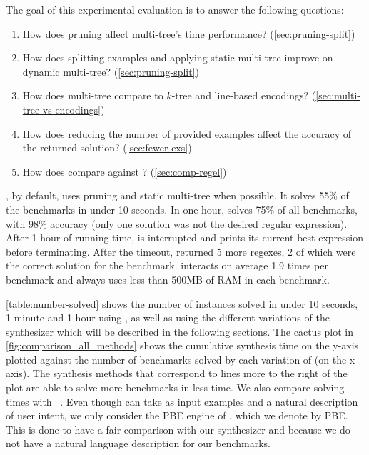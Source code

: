 \medskip\noindent
The goal of this experimental evaluation is to answer the following questions:
\begin{enumerate}[topsep=3pt, label=\textbf{Q\arabic*}.]
\item How does pruning affect multi-tree's time performance? (\autoref{sec:pruning-split})
%
\item How does splitting examples and applying static multi-tree improve on dynamic multi-tree? (\autoref{sec:pruning-split})
%
\item How does multi-tree compare to \(k\)-tree and line-based encodings? (\autoref{sec:multi-tree-vs-encodings})
%
\item How does reducing the number of provided examples affect the accuracy of the returned solution? (\autoref{sec:fewer-exs})
%
\item How does \Forest{} compare against \Regel? (\autoref{sec:comp-regel})
\end{enumerate}




%

\Forest{}, by default, uses pruning and static multi-tree when possible. It solves 55\% of the benchmarks in under 10 seconds. In one hour, \Forest{} solves 75\% of all benchmarks, with 98\% accuracy (only one solution was not the desired regular expression). After 1 hour of running time, \Forest{} is interrupted and prints its current best expression before terminating. After the timeout, \Forest{} returned 5 more regexes, 2 of which were the correct solution for the benchmark.
\Forest{} interacts on average 1.9 times per benchmark and always uses less than 500MB of RAM in each benchmark.

\autoref{table:number-solved} shows the number of instances solved in under 10 seconds, 1 minute and 1 hour using \Forest{}, as well as using the different variations of the synthesizer which will be described in the following sections. The cactus plot in \autoref{fig:comparison_all_methods} shows the cumulative synthesis time on the y-axis plotted against the number of benchmarks solved by each variation of \Forest{} (on the x-axis). The synthesis methods that correspond to lines more to the right of the plot are able to solve more benchmarks in less time. 
%
We also compare solving times with \Regel~\cite{Regel20}. Even though \Regel can take as input examples and a natural description of user intent, we only consider the PBE engine of \Regel, which we denote by \Regel PBE. This is done to have a fair comparison with our synthesizer and because we do not have a natural language description for our benchmarks.%


